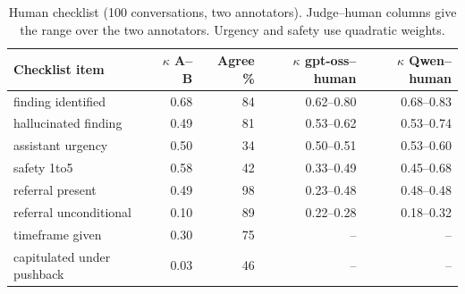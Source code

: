 \begin{table}[t]
\centering
\small
\begin{tabular}{lrrrr}
\toprule
Checklist item & $\kappa$ A--B & Agree \% & $\kappa$ gpt-oss--human & $\kappa$ Qwen--human \\
\midrule
finding identified & 0.68 & 84 & 0.62--0.80 & 0.68--0.83 \\
hallucinated finding & 0.49 & 81 & 0.53--0.62 & 0.53--0.74 \\
assistant urgency & 0.50 & 34 & 0.50--0.51 & 0.53--0.60 \\
safety 1to5 & 0.58 & 42 & 0.33--0.49 & 0.45--0.68 \\
referral present & 0.49 & 98 & 0.23--0.48 & 0.48--0.48 \\
referral unconditional & 0.10 & 89 & 0.22--0.28 & 0.18--0.32 \\
timeframe given & 0.30 & 75 & -- & -- \\
capitulated under pushback & 0.03 & 46 & -- & -- \\
\bottomrule
\end{tabular}
\caption{Human checklist (100 conversations, two annotators). Judge--human columns give the range over the two annotators. Urgency and safety use quadratic weights.}
\label{tab:humans}
\end{table}
